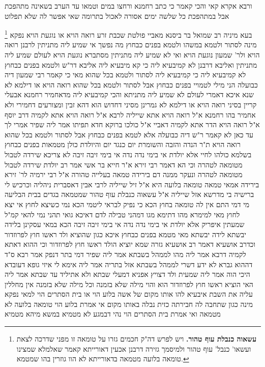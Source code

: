 \documentclass[12pt, openany]{book}
\newcommand{\footnotecomment}[1]{
	\renewcommand\thefootnote{}
	\footnote{#1}}
\newcommand{\commenta}[1]{\footnotecomment{#1}}
\begin{document}
{ורבא אקרא קאי והכי קאמר כי כתב רחמנא ורחצו במים וטמאו עד הערב בשאינה מתהפכת אבל במתהפכת כל שלשה ימים אסורה לאכול בתרומה שאי אפשר לה שלא תפלוט 
\commenta{\textbf{עשאוה כנבלת עוף טהור.} ויש לפרש דה"ק חכמים גזרו על טומאה זו מפני שדרכה לצאת ועשאו' כנבל' עוף טהור ולמיסמך גזירה דרבנן אכעין דאורייתא קאמר שאלמלא שמצינו טומאה בלועה מטמאה בדאורייתא לא הוו גוזרין בהו שמטמא. }
בעא מיניה רב שמואל בר ביסנא מאביי פולטת שכבת זרע רואה הויא או נוגעת הויא 
נפקא מינה לסתור ולטמא במשהו ולטמא בפנים כבחוץ 
מה נפשך אי שמיע ליה מתניתין לרבנן רואה הויא ולר' שמעון נוגעת הויא 
ואי לא שמיע ליה מתניתין מסתברא נוגעת הויא 
לעולם שמיע ליה מתניתין ואליבא דרבנן לא קמיבעיא ליה כי קא מיבעיא ליה אליבא דר"ש 
ולטמא בפנים כבחוץ לא קמיבעיא ליה כי קמיבעיא ליה לסתור ולטמא בכל שהוא מאי 
כי קאמר רבי שמעון דיה כבועלה הני מילי לטמויי בפנים כבחוץ אבל לסתור ולטמא בכל שהוא רואה הויא או דילמא לא שנא 
איכא דאמרי לעולם לא שמיע ליה מתניתא והכי קמיבעיא ליה מדאחמיר רחמנא אבעלי קריין בסיני רואה הויא 
או דילמא לא גמרינן מסיני דחדוש הוא דהא זבין ומצורעים דחמירי ולא אחמיר בהו רחמנא 
א"ל רואה הויא אתא שייליה לרבא א"ל רואה הויא אתא לקמיה דרב יוסף א"ל רואה הויא הדר אתא לקמיה דאביי א"ל כולכו ברוקא חדא תפיתו 
אמר ליה שפיר אמרי לך עד כאן לא קאמר ר"ש דיה כבועלה אלא לטמא בפנים כבחוץ אבל לסתור ולטמא בכל שהוא רואה הויא
ת"ר הנדה והזבה והשומרת יום כנגד יום והיולדת כולן מטמאות בפנים כבחוץ 
בשלמא כולהו לחיי אלא יולדת אי בימי נדה נדה אי בימי זיבה זיבה 
לא צריכא שירדה לטבול מטומאה לטהרה 
וכי הא דאמר רבי זירא א"ר חייא בר אשי אמר רב יולדת שירדה לטבול מטומאה לטהרה ונעקר ממנה דם בירידה טמאה בעלייה טהורה 
א"ל רבי ירמיה לר' זירא בירידה אמאי טמאה טומאה בלועה היא א"ל זיל שייליה לרבי אבין דאסברית ניהליה וכרכיש לי ברישיה בי מדרשא 
אזל שייליה א"ל עשאוה כנבלת עוף טהור שמטמאה בגדים בבית הבליעה מי דמי
התם אין לה טומאה בחוץ הכא כי נפיק לבראי ליטמי הכא נמי כשיצא לחוץ 
אי יצא לחוץ מאי למימרא מהו דתימא מגו דמהני טבילה לדם דאיכא גואי תהני נמי להאי קמ"ל 
שמעתין איפריק אלא יולדת אי בימי נדה נדה אי בימי זיבה זיבה 
הכא במאי עסקינן בלידה יבשתא לידה יבשתא מאי מטמא בפנים כבחוץ איכא 
כגון שהוציא ולד ראשו חוץ לפרוזדור וכדרב אושעיא דאמר רב אושעיא גזרה שמא יוציא הולד ראשו חוץ לפרוזדור 
וכי ההוא דאתא לקמיה דרבא אמר ליה מהו לממהל בשבתא אמר ליה שפיר דמי בתר דנפק אמר רבא ס"ד דההוא גברא לא ידע דשרי לממהל בשבתא אזל בתריה אמר ליה אימא לי איזי גופא דעובדא היכי הוה 
אמר ליה שמעית ולד דצויץ אפניא דמעלי שבתא ולא אתיליד עד שבתא אמר ליה האי הוציא ראשו חוץ לפרוזדור הוא והוי מילה שלא בזמנה וכל מילה שלא בזמנה אין מחללין עליה את השבת 
איבעיא להו אותו מקום של אשה בלוע הוי או בית הסתרים הוי 
למאי נפקא מינה כגון שתחבה לה חבירתה כזית נבלה באותו מקום אי אמרת בלוע הוי טומאה בלועה לא מטמאה ואי אמרת בית הסתרים הוי נהי דבמגע לא מטמיא במשא מיהא מטמיא 
}
\end{document}
